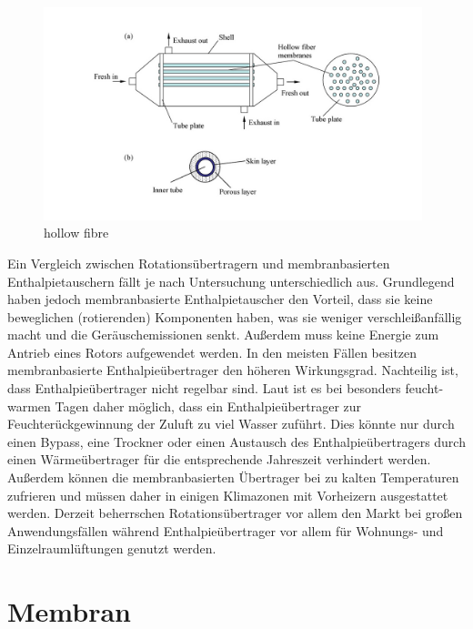 \begin{normalsize}
\begin{LARGE}
\begin{figure} [h]
	\centering
	\includegraphics[width=0.98\textwidth]{pictures/hollow_fibre.jpg}
	\caption{hollow fibre}
	\label{fig:hollow fibre Modul}
\end{figure}

Ein Vergleich zwischen Rotationsübertragern und membranbasierten Enthalpietauschern fällt je nach Untersuchung unterschiedlich aus. Grundlegend haben jedoch membranbasierte Enthalpietauscher den Vorteil, dass sie keine beweglichen (rotierenden) Komponenten haben, was sie weniger verschleißanfällig macht und die Geräuschemissionen senkt. Außerdem muss keine Energie zum Antrieb eines Rotors aufgewendet werden. In den meisten Fällen besitzen membranbasierte Enthalpieübertrager den höheren Wirkungsgrad. \cite{JustoAlonso.2015}  %
Nachteilig ist, dass Enthalpieübertrager nicht regelbar sind. Laut %
ist es bei besonders feucht-warmen Tagen daher möglich, dass ein Enthalpieübertrager zur Feuchterückgewinnung der Zuluft zu viel Wasser zuführt. Dies könnte nur durch einen Bypass, eine Trockner oder einen Austausch des Enthalpieübertragers durch einen Wärmeübertrager für die entsprechende Jahreszeit verhindert werden. Außerdem können die membranbasierten Übertrager bei zu kalten Temperaturen zufrieren und müssen daher in einigen Klimazonen mit Vorheizern ausgestattet werden. Derzeit beherrschen Rotationsübertrager vor allem den Markt bei großen Anwendungsfällen während Enthalpieübertrager vor allem für Wohnungs- und Einzelraumlüftungen genutzt werden.  


\section{Membran}


\end{LARGE}
\end{normalsize}
